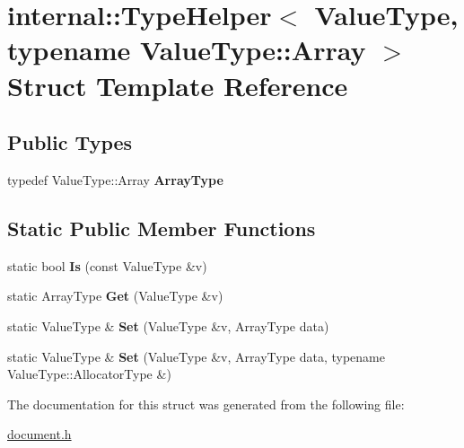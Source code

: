 \hypertarget{a02060}{}\section{internal\+:\+:Type\+Helper$<$ Value\+Type, typename Value\+Type\+:\+:Array $>$ Struct Template Reference}
\label{a02060}
\subsection*{Public Types}
\begin{DoxyCompactItemize}
\item 
\mbox{\label{a02060_a8f384dc96b6104e85b956ec5f7386434}} 
typedef Value\+Type\+::\+Array {\bfseries Array\+Type}
\end{DoxyCompactItemize}
\subsection*{Static Public Member Functions}
\begin{DoxyCompactItemize}
\item 
\mbox{\label{a02060_a2a052fc0139112075f8bade42964273d}} 
static bool {\bfseries Is} (const Value\+Type \&v)
\item 
\mbox{\label{a02060_a0e6bd47ab5da0387bf419cdf644035ab}} 
static Array\+Type {\bfseries Get} (Value\+Type \&v)
\item 
\mbox{\label{a02060_a7bab3fa93fb8bda16baf289e1d281315}} 
static Value\+Type \& {\bfseries Set} (Value\+Type \&v, Array\+Type data)
\item 
\mbox{\label{a02060_adba46e8947dcfecaeca5a5a5d8bb36cc}} 
static Value\+Type \& {\bfseries Set} (Value\+Type \&v, Array\+Type data, typename Value\+Type\+::\+Allocator\+Type \&)
\end{DoxyCompactItemize}


The documentation for this struct was generated from the following file\+:\begin{DoxyCompactItemize}
\item 
\hyperlink{a00476}{document.\+h}\end{DoxyCompactItemize}
